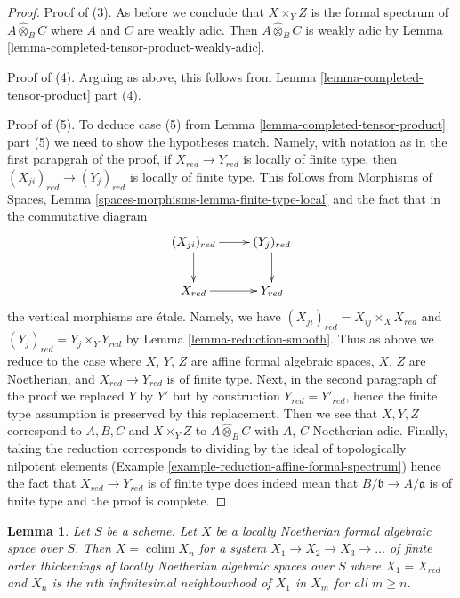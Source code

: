 \documentclass{stacks-project}
\theoremstyle{plain}
\newtheorem{lemma}[subsection]{Lemma}
\theoremstyle{definition}
\theoremstyle{remark}
\numberwithin{equation}{subsection}
\def\colim{\mathop{\mathrm{colim}}\nolimits}
\begin{document}
\begin{proof}
\medskip\noindent
Proof of (3). As before we conclude that $X \times_Y Z$ is the formal spectrum
of $A \widehat{\otimes}_B C$ where $A$ and $C$ are weakly adic.
Then $A \widehat{\otimes}_B C$ is weakly adic by 
Lemma \ref{lemma-completed-tensor-product-weakly-adic}.

\medskip\noindent
Proof of (4). Arguing as above, this follows from
Lemma \ref{lemma-completed-tensor-product} part (4).

\medskip\noindent
Proof of (5). To deduce case (5) from
Lemma \ref{lemma-completed-tensor-product} part (5)
we need to show the hypotheses match.
Namely, with notation as in the first parapgrah of the proof,
if $X_{red} \to Y_{red}$ is locally of finite type, then
$(X_{ji})_{red} \to (Y_j)_{red}$ is locally of finite type. This follows
from Morphisms of Spaces, Lemma \ref{spaces-morphisms-lemma-finite-type-local}
and the fact that in the commutative diagram
$$
\xymatrix{
(X_{ji})_{red} \ar[d] \ar[r] & (Y_j)_{red} \ar[d] \\
X_{red} \ar[r] & Y_{red}
}
$$
the vertical morphisms are \'etale. Namely, we have
$(X_{ji})_{red} = X_{ij} \times_X X_{red}$ and
$(Y_j)_{red} = Y_j \times_Y Y_{red}$
by Lemma \ref{lemma-reduction-smooth}. Thus as above we reduce
to the case where $X$, $Y$, $Z$ are affine formal algebraic spaces,
$X$, $Z$ are Noetherian, and $X_{red} \to Y_{red}$ is of finite type.
Next, in the second paragraph of the proof we replaced $Y$ by $Y'$
but by construction $Y_{red} = Y'_{red}$, hence the finite type
assumption is preserved by this replacement. Then we see that
$X, Y, Z$ correspond to $A, B, C$ and $X \times_Y Z$ to
$A \widehat{\otimes}_B C$ with $A$, $C$ Noetherian adic.
Finally, taking the reduction corresponds to dividing by the
ideal of topologically nilpotent elements
(Example \ref{example-reduction-affine-formal-spectrum})
hence the fact that $X_{red} \to Y_{red}$ is of finite type
does indeed mean that $B/\mathfrak b \to A/\mathfrak a$ is of finite type
and the proof is complete.
\end{proof}

\begin{lemma}
\label{lemma-structure-locally-noetherian}
Let $S$ be a scheme. Let $X$ be a locally Noetherian formal algebraic space
over $S$. Then $X = \colim X_n$ for a system $X_1 \to X_2 \to X_3 \to \ldots$
of finite order thickenings of locally Noetherian algebraic spaces over $S$
where $X_1 = X_{red}$ and $X_n$ is the $n$th infinitesimal neighbourhood of
$X_1$ in $X_m$ for all $m \geq n$.
\end{lemma}
\end{document}
